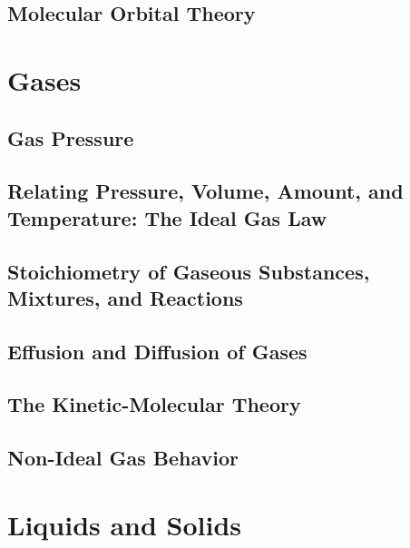 \documentclass[12pt, openany, letterpaper]{memoir}
\begin{document}
\section{Molecular Orbital Theory}

\chapter{Gases}

\section{Gas Pressure}

\section{Relating Pressure, Volume, Amount, and Temperature: The Ideal Gas Law}

\section{Stoichiometry of Gaseous Substances, Mixtures, and Reactions}

\section{Effusion and Diffusion of Gases}

\section{The Kinetic-Molecular Theory}

\section{Non-Ideal Gas Behavior}

\chapter{Liquids and Solids}
\end{document}
